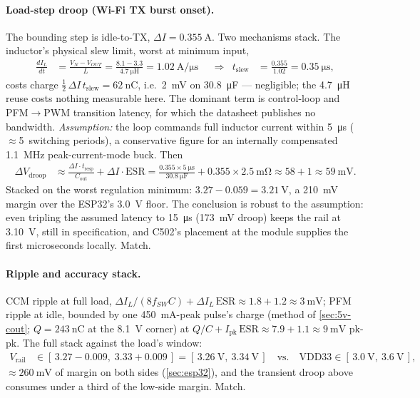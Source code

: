 \paragraph{Load-step droop (Wi-Fi TX burst onset).} The bounding step is
idle-to-TX, $\Delta I = \SI{0.355}{\ampere}$. Two mechanisms stack. The inductor's
physical slew limit, worst at minimum input,
\begin{align*}
  \frac{dI_L}{dt} &= \frac{V_N - V_{OUT}}{L} = \frac{8.1-3.3}{\SI{4.7}{\micro\henry}}
    = \SI{1.02}{\ampere\per\micro\second}
  &&\Rightarrow&
  t_{\mathrm{slew}} &= \frac{0.355}{1.02} = \SI{0.35}{\micro\second},
\end{align*}
costs charge $\tfrac{1}{2}\,\Delta I\, t_{\mathrm{slew}} = \SI{62}{\nano\coulomb}$,
i.e.\ \SI{2}{\milli\volt} on \SI{30.8}{\micro\farad} --- negligible; the
\SI{4.7}{\micro\henry} reuse costs nothing measurable here. The dominant term is
control-loop and PFM$\to$PWM transition latency, for which the datasheet publishes no
bandwidth. \emph{Assumption:} the loop commands full inductor current within
\SI{5}{\micro\second} ($\approx$5~switching periods), a conservative figure for an
internally compensated \SI{1.1}{\mega\hertz} peak-current-mode buck. Then
\begin{align*}
  \Delta V_{\mathrm{droop}} &\approx \frac{\Delta I \cdot t_{\mathrm{resp}}}{C_{\mathrm{out}}}
      + \Delta I \cdot \mathrm{ESR}
    = \frac{0.355 \times \SI{5}{\micro\second}}{\SI{30.8}{\micro\farad}} + 0.355\times\SI{2.5}{\milli\ohm}
    \approx 58 + 1 \approx \SI{59}{\milli\volt}.
\end{align*}
Stacked on the worst regulation minimum: $3.27 - 0.059 = \SI{3.21}{\volt}$, a
\SI{210}{\milli\volt} margin over the ESP32's \SI{3.0}{\volt} floor. The conclusion is
robust to the assumption: even tripling the assumed latency to \SI{15}{\micro\second}
(\SI{173}{\milli\volt} droop) keeps the rail at \SI{3.10}{\volt}, still in
specification, and C502's placement at the module supplies the first microseconds
locally. Match.

\paragraph{Ripple and accuracy stack.} CCM ripple at full load,
$\Delta I_L/(8 f_{SW} C) + \Delta I_L\,\mathrm{ESR} \approx 1.8 + 1.2 \approx
\SI{3}{\milli\volt}$; PFM ripple at idle, bounded by one
\SI{450}{\milli\ampere}-peak pulse's charge (method of \cref{sec:5v-cout};
$Q = \SI{243}{\nano\coulomb}$ at the \SI{8.1}{\volt} corner) at
$Q/C + I_{\mathrm{pk}}\,\mathrm{ESR} \approx 7.9 + 1.1 \approx \SI{9}{\milli\volt}$
pk-pk. The full stack against the load's window:
\begin{align*}
  V_{\mathrm{rail}} &\in [\,3.27 - 0.009,\; 3.33 + 0.009\,]
    = [\,\SI{3.26}{\volt},\ \SI{3.34}{\volt}\,]
  \quad\text{vs.}\quad \text{VDD33} \in [\,\SI{3.0}{\volt},\ \SI{3.6}{\volt}\,],
\end{align*}
$\approx\SI{260}{\milli\volt}$ of margin on both sides (\cref{sec:esp32}), and the
transient droop above consumes under a third of the low-side margin. Match.


